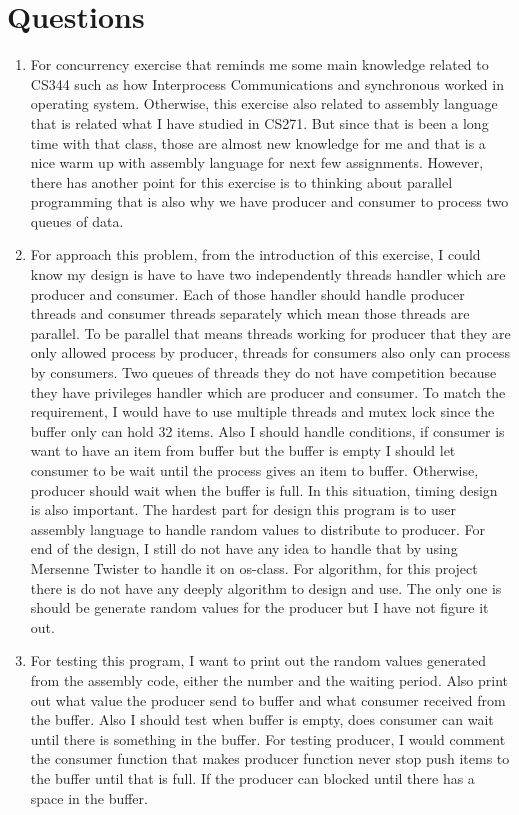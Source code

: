 \documentclass[letterpaper,11pt,titlepage]{article}
\begin{document}
\section{Questions}
\begin{enumerate}

\item For concurrency exercise that reminds me some main knowledge related to CS344 such as how Interprocess Communications and synchronous worked in operating system.
Otherwise, this exercise also related to assembly language that is related what I have studied in CS271. But since that is been a long time with that class, those are 
almost new knowledge for me and that is a nice warm up with assembly language for next few assignments. However, there has another point for this exercise is to thinking
about parallel programming that is also why we have producer and consumer to process two queues of data. 

\item For approach this problem, from the introduction of this exercise, I could know my design is have to have two independently threads handler which are producer and consumer.
Each of those handler should handle producer threads and consumer threads separately which mean those threads are parallel. To be parallel that means threads working for producer that they
are only allowed process by producer, threads for consumers also only can process by consumers. Two queues of threads they do not have competition because they have privileges handler which are 
producer and consumer. To match the requirement, I would have to use multiple threads and mutex lock since the buffer only can hold 32 items. Also I should handle conditions, if consumer is want to 
have an item from buffer but the buffer is empty I should let consumer to be wait until the process gives an item to buffer. Otherwise, producer should wait when the buffer is full. In this situation, timing design 
is also important. The hardest part for design this program is to user assembly language to handle random values to distribute to producer. For end of the design, I still do not have any idea to handle that by using 
Mersenne Twister to handle it on os-class. For algorithm, for this project there is do not have any deeply algorithm to design and use. The only one is should be generate random values for the producer but I have not
figure it out.

\item For testing this program, I want to print out the random values generated from the assembly code, either the number and the waiting period. Also print out what value the producer send to buffer and what consumer received from the buffer. 
Also I should test when buffer is empty, does consumer can wait until there is something in the buffer. For testing producer, I would comment the consumer function that makes producer function never stop push items to the buffer
until that is full. If the producer can blocked until there has a space in the buffer.


\end{enumerate}
\end{document}
